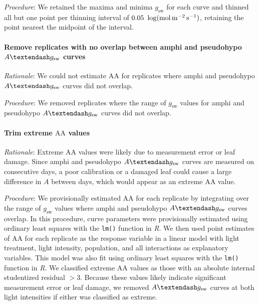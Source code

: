 \documentclass[
  letterpaper,
  DIV=11,
  numbers=noendperiod]{scrartcl}
\let\oldparagraph\paragraph
\renewcommand{\paragraph}[1]{\oldparagraph{#1}\mbox{}}
\newcommand{\aax}{$\mathrm{AA}$}
\newcommand{\agcurve}{$A \textendash g_\text{sw}$}
\newcommand{\gsw}{$g_\text{sw}$}
\begin{document}
\emph{Procedure}: We retained the maxima and minima \gsw{} for each
curve and thinned all but one point per thinning interval of
\(0.05~\log(\si{\mol\raiseto{-2}\meter\raiseto{-1}\second})\), retaining
the point nearest the midpoint of the interval.

\paragraph{\texorpdfstring{Remove replicates with no overlap between
amphi and pseudohypo \agcurve{}
curves}{Remove replicates with no overlap between amphi and pseudohypo  curves}}\label{remove-replicates-with-no-overlap-between-amphi-and-pseudohypo-curves}

\emph{Rationale}: We could not estimate \aax{} for replicates where
amphi and pseudohypo \agcurve{} curves did not overlap.

\emph{Procedure}: We removed replicates where the range of \gsw{} values
for amphi and pseudohypo \agcurve{} curves did not overlap.

\paragraph{\texorpdfstring{Trim extreme \aax{}
values}{Trim extreme  values}}\label{trim-extreme-values}

\emph{Rationale}: Extreme \aax{} values were likely due to measurement
error or leaf damage. Since amphi and pseudohypo \agcurve{} curves are
measured on consecutive days, a poor calibration or a damaged leaf could
cause a large difference in \(A\) between days, which would appear as an
extreme \aax{} value.

\emph{Procedure}: We provisionally estimated \aax{} for each replicate
by integrating over the range of \gsw{} values where amphi and
pseudohypo \agcurve{} curves overlap. In this procedure, curve
parameters were provisionally estimated using ordinary least squares
with the \texttt{lm()} function in \emph{R}. We then used point
estimates of \aax{} for each replicate as the response variable in a
linear model with light treatment, light intensity, population, and all
interactions as explanatory variables. This model was also fit using
ordinary least squares with the \texttt{lm()} function in \emph{R}. We
classified extreme \aax{} values as those with an absolute internal
studentized residual \(> 3\). Because these values likely indicate
significant measurement error or leaf damage, we removed \agcurve{}
curves at both light intensities if either was classified as extreme.
\end{document}
